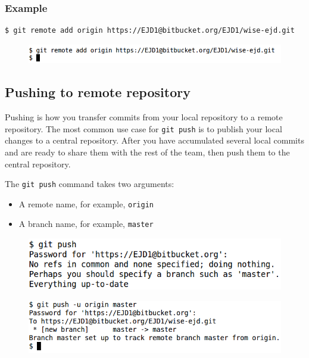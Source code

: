 \documentclass[11pt,a4paper]{article}
\begin{document}
\subsubsection*{Example}
\begin{verbatim}
$ git remote add origin https://EJD1@bitbucket.org/EJD1/wise-ejd.git
\end{verbatim}
\begin{figure}[H]
    \begin{center}
        \includegraphics[scale=0.5]{remote.png}       
       \end{center}
    \end{figure}


\subsection*{Pushing to remote repository}
Pushing is how you transfer commits from your local repository to a remote repository. The most common use case for 
\texttt{git push} is to publish your local changes to a central repository. After you have accumulated several local 
commits and are ready to share them with the rest of the team, then push them to the central repository.

The \texttt{git push} command takes two arguments:
\begin{itemize}
\item A remote name, for example, \texttt{origin}
\item A branch name, for example, \texttt{master}
\end{itemize}
\begin{figure}[H]
    \begin{center}
        \includegraphics[scale=0.5]{push1.png}       
       \end{center}
    \end{figure}

\begin{figure}[H]
    \begin{center}
        \includegraphics[scale=0.5]{push2.png}       
       \end{center}
    \end{figure}
\end{document}
